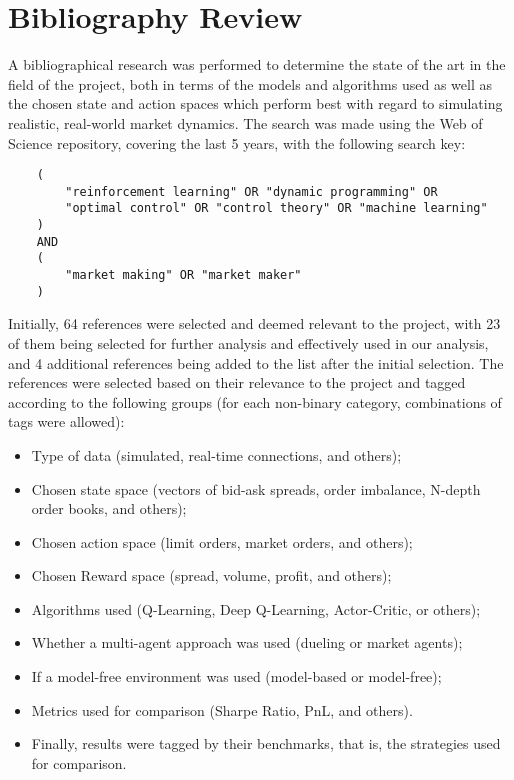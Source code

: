 \section{Bibliography Review}
\label{sec:bibliography-review}

A bibliographical research was performed to determine the state of the art in the field of the project,
both in terms of the models and algorithms used as well as the chosen state and action spaces which perform best
with regard to simulating realistic, real-world market dynamics.
The search was made using the Web of Science repository, covering the last 5 years, with the following search key:

\begin{verbatim}
    (
        "reinforcement learning" OR "dynamic programming" OR
        "optimal control" OR "control theory" OR "machine learning"
    )
    AND
    (
        "market making" OR "market maker"
    )
\end{verbatim}

Initially, 64 references were selected and deemed relevant to the project, with 23 of them being selected for further analysis and effectively used in our analysis,
and 4 additional references being added to the list after the initial selection.
The references were selected based on their relevance to the project and tagged according to the following groups
(for each non-binary category, combinations of tags were allowed):

\begin{itemize}
    \item Type of data (simulated, real-time connections, and others);
    \item Chosen state space (vectors of bid-ask spreads, order imbalance, N-depth order books, and others);
    \item Chosen action space (limit orders, market orders, and others);
    \item Chosen Reward space (spread, volume, profit, and others);
    \item Algorithms used (Q-Learning, Deep Q-Learning, Actor-Critic, or others);
    \item Whether a multi-agent approach was used (dueling or market agents);
    \item If a model-free environment was used (model-based or model-free);
    \item Metrics used for comparison (Sharpe Ratio, PnL, and others).
    \item Finally, results were tagged by their benchmarks, that is, the strategies used for comparison.
\end{itemize}

